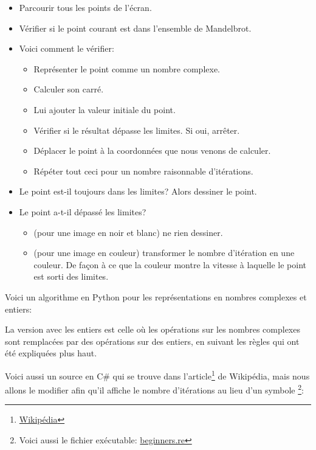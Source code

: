 \begin{itemize}
\item Parcourir tous les points de l'écran.
\item Vérifier si le point courant est dans l'ensemble de Mandelbrot.
\item Voici comment le vérifier:

  \begin{itemize}
  \item Représenter le point comme un nombre complexe.
  \item Calculer son carré.
  \item Lui ajouter la valeur initiale du point.
  \item Vérifier si le résultat dépasse les limites. Si oui, arrêter.
  \item Déplacer le point à la coordonnées que nous venons de calculer.
  \item Répéter tout ceci pour un nombre raisonnable d'itérations.
  \end{itemize}

\item Le point est-il toujours dans les limites? Alors dessiner le point.

\item Le point a-t-il dépassé les limites?

  \begin{itemize}
    \item (pour une image en noir et blanc) ne rien dessiner.
    \item 
(pour une image en couleur) transformer le nombre d'itération en une couleur.
     De façon à ce que la couleur montre la vitesse à laquelle le point est sorti
des limites.
  \end{itemize}

\end{itemize}

%
Voici un algorithme en Python pour les représentations en nombres complexes et entiers:




La version avec les entiers est celle où les opérations sur les nombres complexes
sont remplacées par des opérations sur des entiers, en suivant les règles qui ont
été expliquées plus haut.



Voici aussi un source en C\# qui se trouve dans l'article\footnote{\href{http://ru.wikipedia.org/wiki/Множество_Мандельброта}{Wikipédia}}
de Wikipédia, mais nous allons le modifier afin qu'il affiche le nombre d'itérations au lieu d'un symbole
\footnote{Voici aussi le fichier exécutable: 
\href{http://beginners.re/examples/mandelbrot/dump_iterations.exe}{beginners.re}}:

